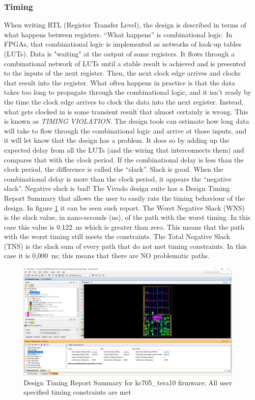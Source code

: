 \subsubsection{Timing}
\noindent When writing RTL (Register Transfer Level)\cite{timing}, the design is described in terms of what happens between registers. “What happens” is combinational logic. In FPGAs, that combinational logic is implemented as networks of look-up tables (LUTs). Data is "waiting" at the output of some registers. It flows through a combinational network of LUTs until a stable result is achieved and is presented to the inputs of the next register. Then, the next clock edge arrives and clocks that result into the register.
What often happens in practice is that the data takes too long to propagate through the combinational logic, and it isn’t ready by the time the clock edge arrives to clock the data into the next register.
Instead, what gets clocked in is some transient result that almost certainly is wrong. This is known as \textit{TIMING VIOLATION}.
The design tools can estimate how long data will take to flow through the combinational logic and arrive at those inputs, and it will let know that the design has a problem. It does so by adding up the expected delay from all the LUTs (and the wiring that interconnects them) and compares that with the clock period.
If the combinational delay is less than the clock period, the difference is called the “slack”. Slack is good. When the combinational delay is more than the clock period, it appears the “negative slack”. Negative slack is bad!
The Vivado design suite has a Design Timing Report Summary that allows the user to easily rate the timing behaviour of the design.
In figure \ref{fig:timingperfect} it can be seen such report.
The Worst Negative Slack (WNS) is the slack value, in nano-seconds (ns), of the path with the worst timing. In this case this value is 0.122~ns which is greater than zero. This means that the path with the worst timing still meets the constraints.
The Total Negative Slack (TNS) is the slack sum of every path that do not met timing constraints. In this case it is 0,000~ns; this means that there are NO problematic paths.
\begin{figure}[H]
	\centering
	\includegraphics[width=0.95\linewidth]{IMG/ch4/TIMING_perfect}
	\caption{Design Timing Report Summary for kc705\_tera10 firmware; All user specified timing constraints are met}
	\label{fig:timingperfect}
\end{figure}


